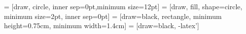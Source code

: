 

%
\usepackage{trfsigns}%
%
 = [draw, circle, inner sep=0pt,minimum size=12pt]%
 = [draw, fill, shape=circle, minimum size=2pt, inner 
sep=0pt]%
 = [draw=black, rectangle, minimum height=0.75cm, minimum 
width=1.4cm]%
 = [draw=black, -latex']%
%

